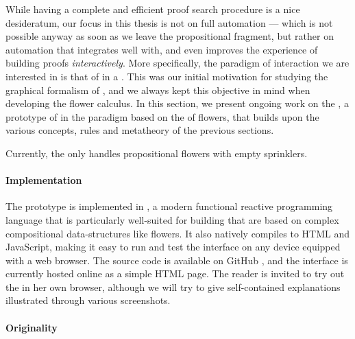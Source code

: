 While having a complete and efficient proof search procedure is a nice
desideratum, our focus in this thesis is not on full automation --- which is not
possible anyway as soon as we leave the propositional fragment, but rather on
automation that integrates well with, and even improves the experience of
building proofs \emph{interactively}. More specifically, the paradigm of
interaction we are interested in is that of \emph{} in a
. This was our initial motivation for studying the graphical formalism
of , and we always kept this objective in mind when developing the
flower calculus. In this section, we present ongoing work on the , a prototype of  in the  paradigm based on
the  of flowers, that builds upon the various concepts,
rules and metatheory of the previous sections.

\begin{remark}
Currently, the  only handles propositional flowers with empty
sprinklers.
\end{remark}

\paragraph{Implementation}

The prototype is implemented in  ,
a modern functional reactive programming language that is particularly
well-suited for building  that are based on complex compositional
data-structures like flowers. It also natively compiles to HTML and JavaScript,
making it easy to run and test the interface on any device equipped with a web
browser. The source code is available on GitHub \cite{flower-prover}, and the
interface is currently hosted online as a simple HTML
page.
The reader is invited to try out the  in her own browser, although
we will try to give self-contained explanations illustrated through various
screenshots.

\paragraph{Originality}


